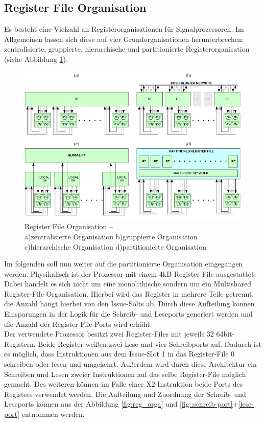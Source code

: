\subsection{Register File Organisation}
Es besteht eine Vielzahl an Registerorganisationen für Signalprozessoren. Im Allgemeinen lassen sich diese auf vier Grundorganisationen herunterbrechen: zentralisierte, gruppierte, hierarchische und partitionierte Registerorganisation (siehe Abbildung \ref{fig:RegisterOrga}).\newline
\begin{figure}[htbp] 
	\centering
	\includegraphics[width=\textwidth]{fig/Register_orga.png}
	\caption{Register File Organisation –\\ a)zentralisierte Organisation b)gruppierte Organisation c)hierarchische Organisation d)partitionierte Organisation  \cite{paya2010multi}}
	\label{fig:RegisterOrga}
\end{figure}
\newline
Im folgenden soll nun weiter auf die partitionierte Organisation eingegangen werden. Physikalisch ist der Prozessor mit einem 4kB Register File ausgestattet. Dabei handelt es sich nicht um eine monolithische sondern um ein Multishared Register-File Organisation. Hierbei wird das Register in mehrere Teile getrennt, die Anzahl hängt hierbei von den Issue-Solts ab. Durch diese Aufteilung können Einsparungen in der Logik für die Schreib- und Leseports generiert werden und die Anzahl der Register-File-Ports wird erhöht.\\
Der verwendete Prozessor besitzt zwei Register-Files mit jeweils 32 64bit-Registern. Beide Register weißen zwei Lese und vier Schreibports auf. Dadurch ist es möglich, dass Instruktionen aus dem Issue-Slot 1 in das Register-File 0 schreiben oder lesen und umgekehrt. Außerdem wird durch diese Architektur ein Schreiben und Lesen zweier Instruktionen auf das selbe Register-File möglich gemacht. Des weiteren können im Falle einer X2-Instruktion beide Ports des Registers verwendet werden. Die Aufteilung und  Zuordnung der Schreib- und Leseports können aus der Abbildung \ref{fig:reg_orga} und \ref{fig::schreib-port}+\ref{lese-port} entnommen werden.


